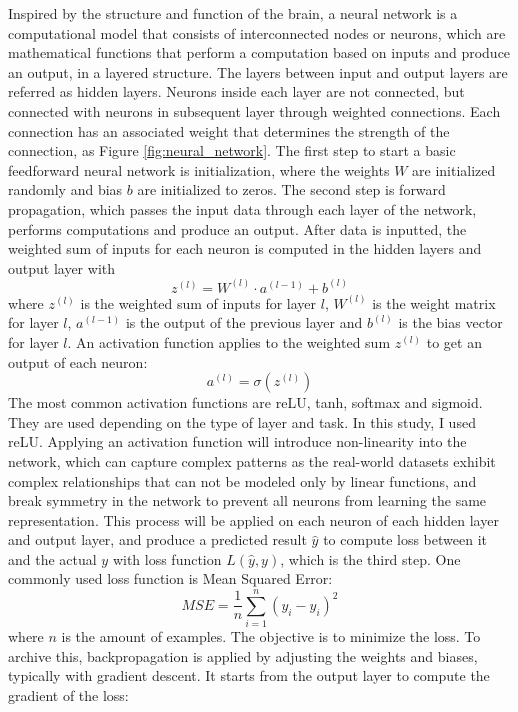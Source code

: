 \documentclass[12pt,a4paper,english
]{tunithesis}
\begin{document}
Inspired by the structure and function of the brain, a neural network is a computational model that consists of  interconnected nodes or neurons, which are mathematical functions that perform a computation based on inputs and produce an output, in a layered structure. The layers between input and output layers are referred as hidden layers. Neurons inside each layer are not connected, but connected with neurons in subsequent layer through weighted connections. Each connection has an associated weight that determines the strength of the connection, as Figure \ref{fig:neural_network}. The first step to start a basic feedforward neural network is initialization, where the weights $W$ are initialized randomly and bias $b$ are initialized to zeros. The second step is forward propagation, which passes the input data through each layer of the network, performs computations and produce an output. After data is inputted, the weighted sum of inputs for each neuron is computed in the hidden layers and output layer with
\begin{equation}
    z^{(l)}=W^{(l)} \cdot a^{(l-1)}+b^{(l)}
\end{equation}
where $z^{(l)}$ is the weighted sum of inputs for layer $l$, $W^{(l)}$ is the weight matrix for layer $l$, $a^{(l-1)}$ is the output of the previous layer and $b^{(l)}$ is the bias vector for layer $l$. An activation function applies to the weighted sum $z^{(l)}$ to get an output of each neuron:
\begin{equation}
    a^{(l)}=\sigma\left(z^{(l)}\right)
\end{equation}
The most common activation functions are reLU, tanh, softmax and sigmoid. They are used depending on the type of layer and task. In this study, I used reLU. Applying an activation function will introduce non-linearity into the network, which can capture complex patterns as the real-world datasets exhibit complex relationships that can not be modeled only by linear functions, and break symmetry in the network to prevent all neurons from learning the same representation. This process will be applied on each neuron of each hidden layer and output layer, and produce a predicted result $\hat{y}$ to compute loss between it and the actual $y$ with loss function $L(\hat{y}, y)$, which is the third step. One commonly used loss function is Mean Squared Error:
\begin{equation}
\label{eq:mse}
    M S E=\frac{1}{n} \sum_{i=1}^n\left(y_i-\hat{y}_i\right)^2
\end{equation}
where $n$ is the amount of examples. The objective is to minimize the loss. To archive this, backpropagation is applied by adjusting the weights and biases, typically with gradient descent. It starts from the output layer to compute the gradient of the loss:
\end{document}

